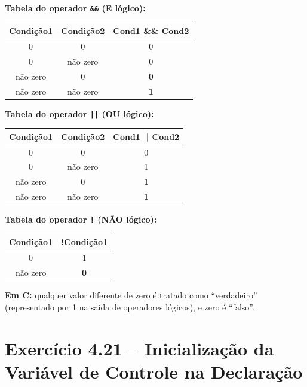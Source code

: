 \documentclass[12pt,a4paper]{article}
\begin{document}
\begin{respostabox}

\textbf{Tabela do operador \texttt{\&\&} (E lógico):}
\begin{center}
\renewcommand{\arraystretch}{1.4}
\begin{tabular}{c c c}
  \toprule
  \textbf{Condição1} & \textbf{Condição2} & \textbf{Cond1 \&\& Cond2} \\ \midrule
  0 & 0 & 0 \\
  0 & não zero & 0 \\
  não zero & 0 & \textbf{0} \\
  não zero & não zero & \textbf{1} \\
  \bottomrule
\end{tabular}
\end{center}

\medskip\textbf{Tabela do operador \texttt{||} (OU lógico):}
\begin{center}
\renewcommand{\arraystretch}{1.4}
\begin{tabular}{c c c}
  \toprule
  \textbf{Condição1} & \textbf{Condição2} & \textbf{Cond1 || Cond2} \\ \midrule
  0 & 0 & 0 \\
  0 & não zero & 1 \\
  não zero & 0 & \textbf{1} \\
  não zero & não zero & \textbf{1} \\
  \bottomrule
\end{tabular}
\end{center}

\medskip\textbf{Tabela do operador \texttt{!} (NÃO lógico):}
\begin{center}
\renewcommand{\arraystretch}{1.4}
\begin{tabular}{c c}
  \toprule
  \textbf{Condição1} & \textbf{!Condição1} \\ \midrule
  0 & 1 \\
  não zero & \textbf{0} \\
  \bottomrule
\end{tabular}
\end{center}

\textbf{Em C:} qualquer valor diferente de zero é tratado como ``verdadeiro''
(representado por 1 na saída de operadores lógicos), e zero é ``falso''.
\end{respostabox}

\section{Exercício 4.21 -- Inicialização da Variável de Controle na Declaração}
\end{document}
